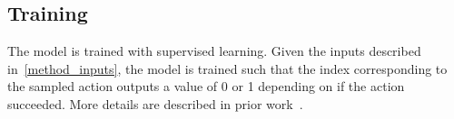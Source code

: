 \documentclass[10pt,twocolumn,letterpaper]{article}
\begin{document}
  


      
      

\subsection{Training}
\label{method_train}

The model is trained with supervised learning. Given the inputs described in~\cref{method_inputs}, the model is trained such that the index corresponding to the sampled action outputs a value of 0 or 1 depending on if the action succeeded. More details are described in prior work~\cite{xu2020adagrasp}.
\end{document}
